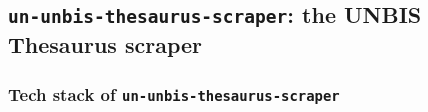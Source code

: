 
\subsection{\texttt{un-unbis-thesaurus-scraper}: the UNBIS Thesaurus scraper} \label{ssec:un-unbis-thesaurus-scraper-the-unbis-thesaurus-scraper}

\subsubsection*{Tech stack of \texttt{un-unbis-thesaurus-scraper}} \label{sssec:tech-stack-of-un-unbis-thesaurus-scraper}

